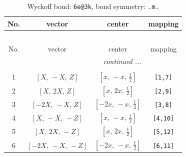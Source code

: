 \documentclass[fleqn,8pt]{jsarticle}
\begin{document}
\renewcommand{\arraystretch}{1.2}
\begin{longtable}{cccc}
\caption{Wyckoff bond: {\tt 6e@3k}, bond symmetry: {\tt .m.}}
 \\
 \hline \hline
No. & vector & center & mapping \\ \hline \endfirsthead

\multicolumn{3}{l}{\tablename\ \thetable{}} \\
 \hline \hline
No. & vector & center & mapping \\ \hline \endhead

 \hline \hline
\multicolumn{3}{r}{\footnotesize\it continued ...} \\ \endfoot

 \hline \hline
\multicolumn{3}{r}{} \\ \endlastfoot

1 & $\left[ X,\, - X,\, Z \right]$ & $\left[ x,\, - x,\, \frac{1}{2} \right]$ & {\tt [1,7]} \\ \hline
2 & $\left[ X,\, 2 X,\, Z \right]$ & $\left[ x,\, 2 x,\, \frac{1}{2} \right]$ & {\tt [2,9]} \\ \hline
3 & $\left[ - 2 X,\, - X,\, Z \right]$ & $\left[ - 2 x,\, - x,\, \frac{1}{2} \right]$ & {\tt [3,8]} \\ \hline
4 & $\left[ X,\, - X,\, - Z \right]$ & $\left[ x,\, - x,\, \frac{1}{2} \right]$ & {\tt [4,10]} \\ \hline
5 & $\left[ X,\, 2 X,\, - Z \right]$ & $\left[ x,\, 2 x,\, \frac{1}{2} \right]$ & {\tt [5,12]} \\ \hline
6 & $\left[ - 2 X,\, - X,\, - Z \right]$ & $\left[ - 2 x,\, - x,\, \frac{1}{2} \right]$ & {\tt [6,11]} \\
\end{longtable}
\renewcommand{\arraystretch}{1.2}
\end{document}
